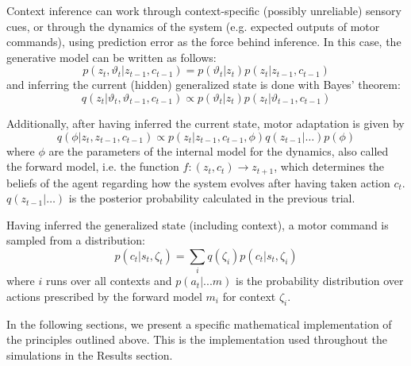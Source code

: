 \documentclass[a4paper,doc,floatsintext,natbib]{apa6}%
\begin{document}
Context inference can work through context-specific (possibly unreliable) sensory cues,
or through the dynamics of the system (e.g. expected outputs of motor
commands), using prediction error as the force behind inference. In this case,
the generative model can be written as follows:
\[
p(z_t, \vartheta_t | z_{t-1}, c_{t-1}) = p(\vartheta_t | z_t)p(z_t|z_{t-1}, c_{t-1})
\]
and inferring the current (hidden) generalized state is done with Bayes' theorem:
\[
  q(z_t | \vartheta_t, \vartheta_{t-1}, c_{t-1}) \propto p(\vartheta_t | z_t)p(z_t|\vartheta_{t-1}, c_{t-1})
\]
  
Additionally, after having inferred the current state, motor adaptation is given by
\begin{equation}
q(\phi | z_t, z_{t-1}, c_{t-1}) \propto p(z_t | z_{t-1}, c_{t-1}, \phi)q(z_{t-1}|\ldots)p(\phi) \label{eqn:motor-adaptation}
\end{equation}
where $\phi$ are the parameters of the internal model for the dynamics, also called the forward model,
i.e. the function $f: (z_t, c_t) \rightarrow z_{t+1}$, which determines the beliefs of
the agent regarding how the system evolves after having taken action $c_t$. $q(z_{t-1}|\ldots)$ is the
posterior probability calculated in the previous trial.

Having inferred the generalized state (including context), a motor command is
sampled from a distribution:
\begin{equation}
p(c_t | s_t, \zeta_t) = \displaystyle\sum_{i}q(\zeta_i)p(c_t | s_t, \zeta_i)
\end{equation}
where $i$ runs over all contexts and $p(a_t | ... m)$ is the probability distribution over actions
prescribed by the forward model $m_i$ for context $\zeta_i$.

In the following sections, we present a specific mathematical implementation
of the principles outlined above. This is the implementation used throughout the
simulations in the Results section.
\end{document}
